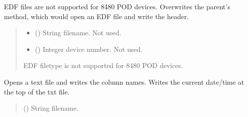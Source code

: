 \documentclass[letterpaper,10pt,english]{sphinxmanual}
\begin{document}
\begin{fulllineitems}
\begin{fulllineitems}
\label{\detokenize{Setup.SetupOneDevice:Setup.SetupOneDevice.Setup_8274D.Setup8274D._OpenSaveFile_EDF}}
\pysigstartsignatures
{}
\pysigstopsignatures
\sphinxAtStartPar
EDF files are not supported for 8480 POD devices. Overwrites the         parent’s method, which would open an EDF file and write the header.
\begin{quote}\begin{description}
\begin{itemize}
\item {} 
\sphinxAtStartPar
{} () \textendash{} String filename. Not used.

\item {} 
\sphinxAtStartPar
{} () \textendash{} Integer device number. Not used.

\end{itemize}

\sphinxAtStartPar
{} \textendash{} EDF filetype is not supported for 8480 POD devices.

\end{description}\end{quote}

\end{fulllineitems}


\begin{fulllineitems}
\label{\detokenize{Setup.SetupOneDevice:Setup.SetupOneDevice.Setup_8274D.Setup8274D._OpenSaveFile_TXT}}
\pysigstartsignatures
{}
\pysigstopsignatures
\sphinxAtStartPar
Opens a text file and writes the column names. Writes the current date/time             at the top of the txt file.
\begin{quote}\begin{description}
\sphinxAtStartPar
{} () \textendash{} String filename.


\end{description}
\end{quote}
\end{fulllineitems}
\end{fulllineitems}
\end{document}
